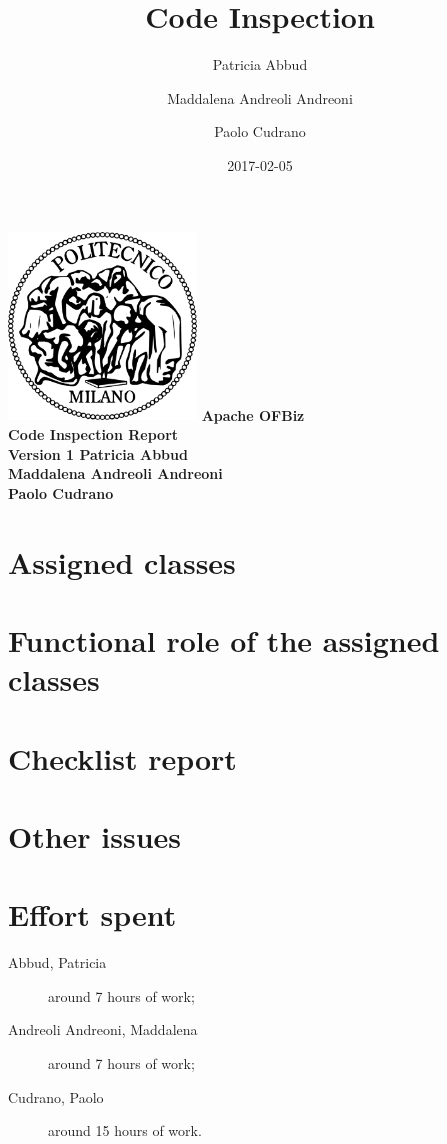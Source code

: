 \documentclass[12pt, a4paper]{article}
\title{Code Inspection }
\date{2017-02-05}
\author{
	Patricia Abbud
	\and
	Maddalena Andreoli Andreoni
	\and
	Paolo Cudrano
}
\begin{document}
	\begin{titlepage}
		\centering
		\includegraphics[width=5cm]{img/polimi_logo.png} %
		\vfill
		{\bfseries\Large
			Apache OFBiz\\
			Code Inspection Report\\
			Version 1
			\vskip4cm
			Patricia Abbud\\
			Maddalena Andreoli Andreoni\\
			Paolo Cudrano\\
		}
		\vfill
		\vfill
	\end{titlepage}

	\tableofcontents
	\newpage

	\newpage
	\section{Assigned classes}
		

	\newpage
	\section{Functional role of the assigned classes}
		

	\newpage
	\section{Checklist report}
		

	\newpage
	\section{Other issues}
		

	\newpage
	\section{Effort spent}
		\begin{description}
			\item[Abbud, Patricia] around 7 hours of work;
			\item[Andreoli Andreoni, Maddalena] around 7 hours of work;
			\item[Cudrano, Paolo] around 15 hours of work.
		\end{description}

	\newpage
	
\end{document}
